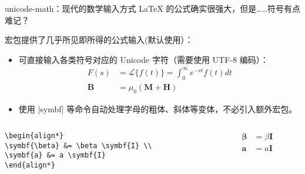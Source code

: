\begin{frame}[fragile,label={frame:unicode-math}]{unicode-math：现代的数学输入方式}
\LaTeX{} 的公式确实很强大，但是……符号有点难记？

 宏包提供了几乎所见即所得的公式输入(\ThuThesis 默认使用）：

\begin{itemize}
  \item 可直接输入各类符号对应的 Unicode 字符（需要使用 UTF-8 编码）：
  \begin{align*}
    𝐹(𝑠) &= ℒ\{𝑓(𝑡)\} = ∫_0^∞ e^{−𝑠𝑡} 𝑓(𝑡) d𝑡 \\
    𝐁 &= 𝜇_0(𝐌 + 𝐇)
  \end{align*}
  \item 使用 |symbf| 等命令自动处理字母的粗体、斜体等变体，不必引入额外宏包。
\end{itemize}

\begin{columns}[c]
  \begin{column}{0.45\textwidth}
    \begin{lstlisting}[basicstyle=\ttfamily]
\begin{align*}
\symbf{\beta} &= \beta \symbf{I} \\
\symbf{a} &= a \symbf{I}
\end{align*}
\end{lstlisting}
\end{column}\hspace{1em}
  \begin{column}{0.45\textwidth}
  \begin{align*}
      \symbf{\beta} &= \beta \symbf{I} \\
      \symbf{a} &= a \symbf{I}
  \end{align*}
  \end{column}
\end{columns}

\end{frame}




